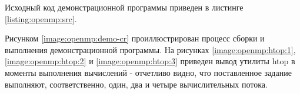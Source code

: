 Исходный код демонстрационной программы приведен в листинге \ref{listing:openmp:src}.

Рисунком \ref{image:openmp:demo-cr} проиллюстрирован процесс сборки и выполнения демонстрационной программы. На рисунках \ref{image:openmp:htop:1}, \ref{image:openmp:htop:2} и \ref{image:openmp:htop:3} приведен вывод утилиты htop в моменты выполнения вычислений - отчетливо видно, что поставленное задание выполняют, соответственно, один, два и четыре вычислительных потока.


